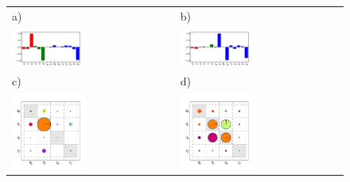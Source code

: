 \begin{figure}[ht!]
	\centering
	\begin{tabular}{ll}
	a) & b) \\
	\includegraphics[width=0.48\textwidth]{"./data/ct5/2011_04_21 - grover and tomo/good_data/pauli_set_2"} & \includegraphics[width=0.48\textwidth]{"./data/ct5/2011_04_21 - grover and tomo/good_data/pauli_set_3"} \\
	c) & d) \\
	\includegraphics[width=0.48\textwidth]{"./data/ct5/2011_04_21 - grover and tomo/good_data/input_matrices_1"} & \includegraphics[width=0.48\textwidth]{"./data/ct5/2011_04_21 - grover and tomo/good_data/output_matrices_1"} \\

\end{tabular}
\end{figure}
